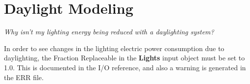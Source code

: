 \section{Daylight Modeling}\label{daylight-modeling}

\emph{Why isn't my lighting energy being reduced with a daylighting system?}

In order to see changes in the lighting electric power consumption due to daylighting, the Fraction Replaceable in the \textbf{Lights} input object must be set to 1.0. This is documented in the I/O reference, and also a warning is generated in the ERR file.
